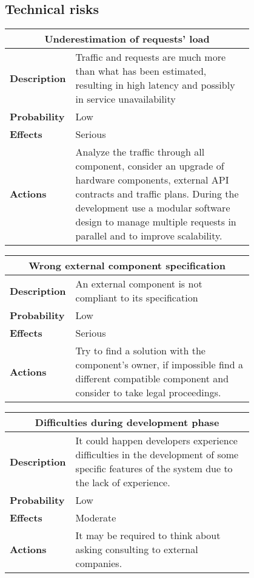\subsection{Technical risks}
\begin{longtable}{lp{0.8\linewidth}}
\multicolumn{2}{c}{\textbf{Underestimation of requests' load}}\\
\toprule
\textbf{Description}&Traffic and requests are much more than what has been estimated, resulting in high latency and possibly in service unavailability\\
\midrule
\textbf{Probability}&Low\\
\midrule
\textbf{Effects}&Serious\\
\midrule
\textbf{Actions}&Analyze the traffic through all component, consider an upgrade of hardware components, external API contracts and traffic plans. During the development use a modular software design to manage multiple requests in parallel and to improve scalability.\\
\bottomrule
\end{longtable}

\begin{longtable}{lp{0.8\linewidth}}
\multicolumn{2}{c}{\textbf{Wrong external component specification}}\\
\toprule
\textbf{Description}&An external component is not compliant to its specification\\
\midrule
\textbf{Probability}&Low\\
\midrule
\textbf{Effects}&Serious\\
\midrule
\textbf{Actions}&Try to find a solution with the component's owner, if impossible find a different compatible component and consider to take legal proceedings.\\
\bottomrule
\end{longtable}

\begin{longtable}{lp{0.8\linewidth}}
\multicolumn{2}{c}{\textbf{Difficulties during development phase}}\\
\toprule
\textbf{Description}& It could happen developers experience difficulties in the development of some specific features of the system due to the lack of experience. \\
\midrule
\textbf{Probability}&Low\\
\midrule
\textbf{Effects}&Moderate\\
\midrule
\textbf{Actions}& It may be required to think about asking consulting to external companies.\\
\bottomrule
\end{longtable}


